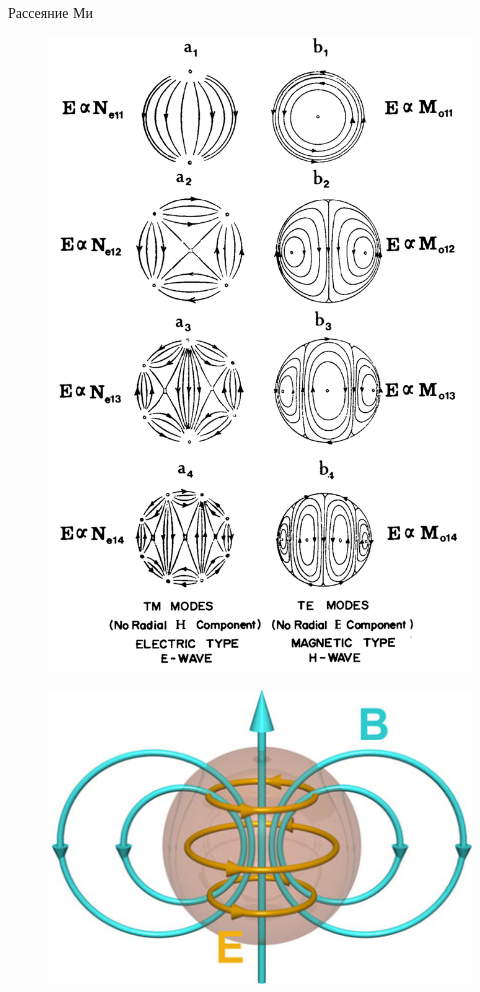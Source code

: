 \begin{frame}{Рассеяние Ми}
	\begin{minipage}[t][\textheight]{.5\textwidth}
		\begin{figure}
			\centering
			\includegraphics[width=.8\textwidth]{img/Mie_total}
			\caption{}
		\end{figure}
	\end{minipage}%
	\begin{minipage}[t][\textheight]{.5\textwidth}
		\begin{figure}
			\centering
			\includegraphics[width=\textwidth]{img/mie_reson}
			\caption{}
		\end{figure}


\end{minipage}
\end{frame}
